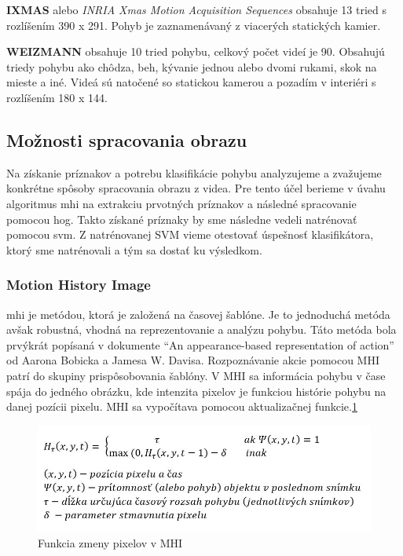 \textbf{IXMAS} alebo \textit{INRIA Xmas Motion Acquisition Sequences} obsahuje 13 tried s rozlíšením 390 x 291. Pohyb je zaznamenávaný z viacerých statických kamier. \cite{c1}

\textbf{WEIZMANN} obsahuje 10 tried pohybu, celkový počet videí je 90. Obsahujú triedy pohybu ako chôdza, beh, kývanie jednou alebo dvomi rukami, skok na mieste a iné. Videá sú natočené so statickou kamerou a pozadím  v interiéri  s rozlíšením 180 x 144. \cite{c1}

\subsection{Možnosti spracovania obrazu}
Na získanie príznakov a potrebu klasifikácie pohybu analyzujeme a zvažujeme konkrétne spôsoby spracovania obrazu z videa. Pre tento účel berieme v úvahu algoritmus \acrfull{mhi} na extrakciu prvotných príznakov a následné spracovanie pomocou \acrfull{hog}. Takto získané príznaky by sme následne vedeli natrénovať pomocou \acrfull{svm}. Z natrénovanej SVM vieme otestovať úspešnosť klasifikátora, ktorý sme natrénovali a tým sa dostať ku výsledkom. 

\subsubsection{Motion History Image}
\acrshort{mhi} je metódou, ktorá je založená na časovej šablóne. Je to jednoduchá metóda avšak robustná, vhodná na reprezentovanie a analýzu pohybu.\cite{c3}  Táto metóda bola prvýkrát popísaná v dokumente ``An appearance-based representation of action'' od Aarona Bobicka a Jamesa W. Davisa.\cite{c2} Rozpoznávanie akcie pomocou MHI patrí do skupiny prispôsobovania šablóny. V MHI sa informácia pohybu v čase spája do jedného obrázku, kde intenzita pixelov je funkciou histórie pohybu na danej pozícii pixelu. MHI sa vypočítava pomocou aktualizačnej funkcie.\ref{MHIeq}


\begin{figure}[!htbp]
  \centering
  \includegraphics[width=14cm]{img/MHIeq.jpg}
  \caption{Funkcia zmeny pixelov v MHI}
  \label{MHIeq}
\end{figure}

